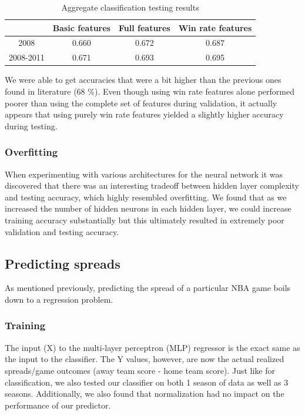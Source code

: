 \documentclass{article}
\begin{document}
\begin{table}
  \begin{center}
    \begin{tabular}{ | c | c | c | c |}
      \hline

            &            	Basic features & 	Full features & Win rate features   \\ \hline
	2008  &     	0.660 & 	0.672  & 0.687  \\ \hline
	2008-2011 &   0.671&  0.693 & 0.695\\ \hline

    \end{tabular}
  \end{center}
  \caption{Aggregate classification testing results}
\end{table}


We were able to get accuracies that were a bit higher than the previous ones found in literature (68 \%). Even though using win rate features alone performed poorer than using the complete set of features during validation, it actually appears that using purely win rate features yielded a slightly higher accuracy during testing.

\subsubsection{Overfitting}
When experimenting with various architectures for the neural network it was discovered that there was an interesting tradeoff between hidden layer complexity and testing accuracy, which highly resembled overfitting. We found that as we increased the number of hidden neurons in each hidden layer, we could increase training accuracy substantially but this ultimately resulted in extremely poor validation and testing accuracy.

\subsection{Predicting spreads}
As mentioned previously, predicting the spread of a particular NBA game boils down to a regression problem.

\subsubsection{Training}
The input (X) to the multi-layer perceptron (MLP) regressor is the exact same as the input to the classifier. The Y values, however, are now the actual realized spreads/game outcomes (away team score - home team score). Just like for classification, we also tested our classifier on both 1 season of data as well as 3 seasons. Additionally, we also found that normalization had no impact on the performance of our predictor.
\end{document}
